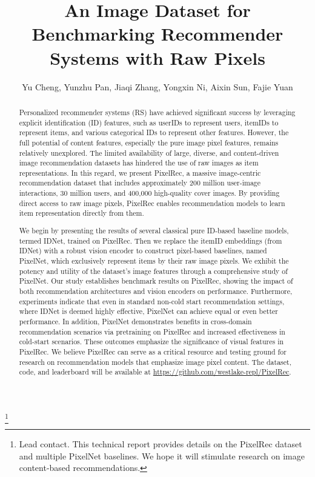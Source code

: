 \documentclass[sigconf]{acmart}
\begin{document}
\title{An Image Dataset for Benchmarking Recommender Systems with Raw Pixels}
\author{Yu Cheng, Yunzhu Pan, Jiaqi Zhang, Yongxin Ni, Aixin Sun, Fajie Yuan}


\thanks{ Lead contact. This technical report provides details on the PixelRec dataset and multiple PixelNet baselines. We hope it will stimulate research on image content-based recommendations.} 

 


\renewcommand{\shortauthors}{Cheng et al.}

\begin{abstract}
Personalized recommender systems (RS) have achieved significant success by leveraging explicit identification (ID) features, such as userIDs to represent users, itemIDs to represent items, and various categorical IDs to represent other features. However, the full potential of content features, especially the pure image pixel features, remains relatively unexplored. The limited availability of large, diverse, and content-driven image recommendation datasets has hindered the use of raw images as item representations. In this regard, we present PixelRec, a massive image-centric recommendation dataset that includes approximately 200 million user-image interactions, 30 million users, and 400,000 high-quality cover images. By providing direct access to raw image pixels, PixelRec enables recommendation models to learn item representation directly from them.

    We begin by presenting the results of several classical pure ID-based baseline models, termed IDNet, trained on PixelRec. Then we replace the itemID embeddings (from IDNet) with a robust vision encoder to construct pixel-based baselines, named PixelNet, which exclusively represent items by their raw image pixels. We exhibit the potency and utility of the dataset's image features through a comprehensive study of PixelNet. Our study  establishes benchmark results on  PixelRec, showing the impact of both   recommendation architectures and vision encoders on performance. Furthermore, experiments indicate that even in standard non-cold start recommendation settings, where IDNet is deemed highly effective, PixelNet can achieve equal or even better performance. In addition, PixelNet demonstrates benefits in cross-domain recommendation scenarios via pretraining on PixelRec and increased effectiveness in cold-start scenarios. These outcomes emphasize the significance of visual features in PixelRec. We believe PixelRec can serve as a critical resource and testing ground for research on recommendation models that emphasize image pixel content.
The dataset, code, and leaderboard will be available at \textcolor{blue}{\url{https://github.com/westlake-repl/PixelRec}}.
	\end{abstract}
 
\end{document}

